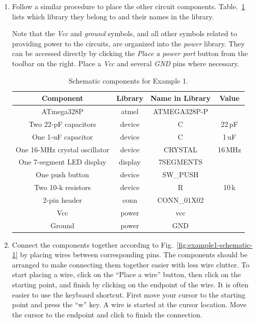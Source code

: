 \documentclass[12pt,letterpaper]{scrartcl}
\begin{document}
\begin{enumerate}
	\item Follow a similar procedure to place the other circuit components. Table.~\ref{tab:example1-sche} lists which library they belong to and their names in the library. 
	
	Note that the \emph{Vcc} and \emph{ground} symbols, and all other symbols related to providing power to the circuits, are organized into the \emph{power} library. They can be accessed directly by clicking the \emph{Place a power port} button from the toolbar on the right. Place a \emph{Vcc} and several \emph{GND} pins where necessary.
	
		\begin{table}[ht]
			\centering
			\caption{Schematic components for Example 1.}
			\begin{tabular}{|c|c|c|c|}
			\hline \bf Component & \bf Library & \bf Name in Library & \bf Value \\
			\hline 
			\hline ATmega328P & atmel & ATMEGA328P-P & \\
			\hline Two 22-pF capacitors & device & C & 22\,pF \\ 
			\hline One 1-uF capacitor & device & C & 1\,uF \\ 
			\hline One 16-MHz crystal oscillator & device & CRYSTAL & 16\,MHz \\ 
			\hline One 7-segment LED display & display & 7SEGMENTS &  \\ 
			\hline One push button & device & SW\_PUSH &  \\ 
			\hline Two 10-k resistors & device & R & 10\,k \\ 
			\hline 2-pin header &  conn & CONN\_01X02 &  \\ 
			\hline Vcc & power & vcc &  \\ 
			\hline Ground & power & GND &  \\ 
			\hline 
			\end{tabular}
			\label{tab:example1-sche}
		\end{table}
	\item Connect the components together according to Fig.~\ref{fig:example1-schematic-1} by placing wires between corresponding pins. The components should be arranged to make connecting them together easier with less wire clutter. To start placing a wire, click on the ``Place a wire'' button, then click on the starting point, and finish by clicking on the endpoint of the wire. It is often easier to use the keyboard shortcut. First move your cursor to the starting point and press the ``w'' key. A wire is started at the cursor location. Move the cursor to the endpoint and click to finish the connection. 
	

\end{enumerate}
\end{document}
